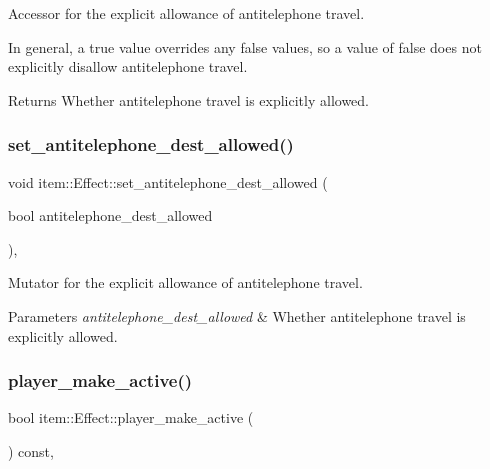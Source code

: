 Accessor for the explicit allowance of antitelephone travel. 

In general, a {\ttfamily true} value overrides any {\ttfamily false} values, so a value of {\ttfamily false} does not explicitly disallow antitelephone travel. \begin{DoxyReturn}{Returns}
Whether antitelephone travel is explicitly allowed. 
\end{DoxyReturn}
\mbox{\label{classitem_1_1_effect_add9197b674f7ebd90c6a412d4a65e0e1}} 
\subsubsection{\texorpdfstring{set\+\_\+antitelephone\+\_\+dest\+\_\+allowed()}{set\_antitelephone\_dest\_allowed()}}
{\footnotesize\ttfamily void item\+::\+Effect\+::set\+\_\+antitelephone\+\_\+dest\+\_\+allowed (\begin{DoxyParamCaption}\item[{bool}]{antitelephone\+\_\+dest\+\_\+allowed }\end{DoxyParamCaption})\hspace{0.3cm}{\ttfamily [inline]}, {\ttfamily [noexcept]}}



Mutator for the explicit allowance of antitelephone travel. 


\begin{DoxyParams}{Parameters}
{\em antitelephone\+\_\+dest\+\_\+allowed} & Whether antitelephone travel is explicitly allowed. \\
\hline
\end{DoxyParams}
\mbox{\label{classitem_1_1_effect_a05de623b49c24c11fdb765c61c0367d0}} 
\subsubsection{\texorpdfstring{player\+\_\+make\+\_\+active()}{player\_make\_active()}}
{\footnotesize\ttfamily bool item\+::\+Effect\+::player\+\_\+make\+\_\+active (\begin{DoxyParamCaption}{ }\end{DoxyParamCaption}) const\hspace{0.3cm}{\ttfamily [inline]}, {\ttfamily [noexcept]}}



